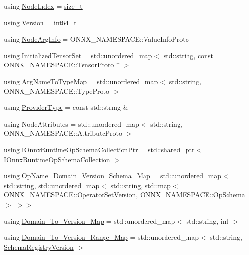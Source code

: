 \begin{DoxyCompactItemize}
\item 
using \mbox{\hyperlink{namespaceonnxruntime_af8773b5c12b5d8fd9292eb2e268df760}{Node\+Index}} = \mbox{\hyperlink{mlasi_8h_a503efbc1c6e50825320ad909366b78ab}{size\+\_\+t}}
\item 
using \mbox{\hyperlink{namespaceonnxruntime_ab7fae8d5830807c074def3bb8ae23cf1}{Version}} = int64\+\_\+t
\item 
using \mbox{\hyperlink{namespaceonnxruntime_a86887111d4a0c110d744c19de4333c04}{Node\+Arg\+Info}} = O\+N\+N\+X\+\_\+\+N\+A\+M\+E\+S\+P\+A\+C\+E\+::\+Value\+Info\+Proto
\item 
using \mbox{\hyperlink{namespaceonnxruntime_a80c06ce917adca79f4a9c0f9ad3147f8}{Initialized\+Tensor\+Set}} = std\+::unordered\+\_\+map$<$ std\+::string, const O\+N\+N\+X\+\_\+\+N\+A\+M\+E\+S\+P\+A\+C\+E\+::\+Tensor\+Proto $\ast$ $>$
\item 
using \mbox{\hyperlink{namespaceonnxruntime_af1034bc0805c639a07a415656396beb3}{Arg\+Name\+To\+Type\+Map}} = std\+::unordered\+\_\+map$<$ std\+::string, O\+N\+N\+X\+\_\+\+N\+A\+M\+E\+S\+P\+A\+C\+E\+::\+Type\+Proto $>$
\item 
using \mbox{\hyperlink{namespaceonnxruntime_a863e2227cbf32aab76aad35fdadff4bb}{Provider\+Type}} = const std\+::string \&
\item 
using \mbox{\hyperlink{namespaceonnxruntime_a7fa616c461850e300cfa552afd46eed4}{Node\+Attributes}} = std\+::unordered\+\_\+map$<$ std\+::string, O\+N\+N\+X\+\_\+\+N\+A\+M\+E\+S\+P\+A\+C\+E\+::\+Attribute\+Proto $>$
\item 
using \mbox{\hyperlink{namespaceonnxruntime_af9a8d0a11a8e0ccd714c7ddc2fabe41d}{I\+Onnx\+Runtime\+Op\+Schema\+Collection\+Ptr}} = std\+::shared\+\_\+ptr$<$ \mbox{\hyperlink{classonnxruntime_1_1IOnnxRuntimeOpSchemaCollection}{I\+Onnx\+Runtime\+Op\+Schema\+Collection}} $>$
\item 
using \mbox{\hyperlink{namespaceonnxruntime_a2750a8e8f860d3ebdc37a35cd340b3d8}{Op\+Name\+\_\+\+Domain\+\_\+\+Version\+\_\+\+Schema\+\_\+\+Map}} = std\+::unordered\+\_\+map$<$ std\+::string, std\+::unordered\+\_\+map$<$ std\+::string, std\+::map$<$ O\+N\+N\+X\+\_\+\+N\+A\+M\+E\+S\+P\+A\+C\+E\+::\+Operator\+Set\+Version, O\+N\+N\+X\+\_\+\+N\+A\+M\+E\+S\+P\+A\+C\+E\+::\+Op\+Schema $>$ $>$$>$
\item 
using \mbox{\hyperlink{namespaceonnxruntime_ab773a024322804641f5eb4964e3471d6}{Domain\+\_\+\+To\+\_\+\+Version\+\_\+\+Map}} = std\+::unordered\+\_\+map$<$ std\+::string, int $>$
\item 
using \mbox{\hyperlink{namespaceonnxruntime_a42522f79cdc7cf087dcf008b2cbcc66e}{Domain\+\_\+\+To\+\_\+\+Version\+\_\+\+Range\+\_\+\+Map}} = std\+::unordered\+\_\+map$<$ std\+::string, \mbox{\hyperlink{structonnxruntime_1_1SchemaRegistryVersion}{Schema\+Registry\+Version}} $>$
$$
\end{DoxyCompactItemize}
